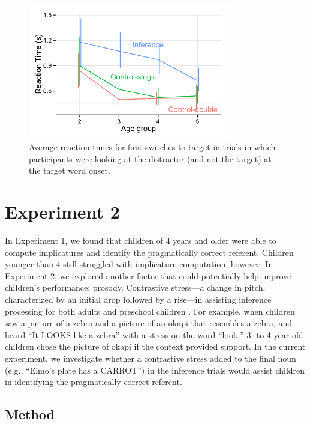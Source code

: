 \documentclass[10pt,letterpaper]{article}
\begin{document}
\begin{figure}
\begin{centering} 
\includegraphics[width=3.5in]{figures/simpimp0-rt_age.pdf}
\caption{\label{fig:rt} Average reaction times for first switches to target in trials in which participants were looking at the distractor (and not the target) at the target word onset.}
\end{centering} 
\end{figure}


\section{Experiment 2}

In Experiment 1, we found that children of 4 years and older were able to compute implicatures and identify the pragmatically correct referent. Children younger than 4 still struggled with implicature computation, however. In Experiment 2, we explored another factor that could potentially help improve children's performance: prosody. Contrastive stress---a change in pitch, characterized by an initial drop followed by a rise---in assisting inference processing for both adults \cite{ito2008anticipatory} and preschool children \cite{kurumada1contextual}. For example, when children saw a picture of a zebra and a picture of an okapi that resembles a zebra, and heard ``It LOOKS like a zebra'' with a stress on the word ``look,'' 3- to 4-year-old children chose the picture of okapi if the context provided support. In the current experiment, we investigate whether a contrastive stress added to the final noun (e.g., ``Elmo's plate has a CARROT'') in the inference trials would assist children in identifying the pragmatically-correct referent.

\subsection{Method}
\end{document}
